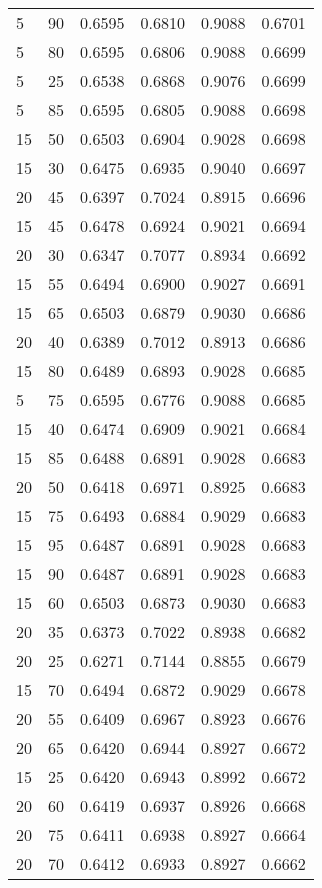 \begin{center}
\begin{longtable}{|l|l|l|l|l|l|}
5  & 90 & 0.6595 & 0.6810 & 0.9088 & 0.6701 \\
5  & 80 & 0.6595 & 0.6806 & 0.9088 & 0.6699 \\
5  & 25 & 0.6538 & 0.6868 & 0.9076 & 0.6699 \\
5  & 85 & 0.6595 & 0.6805 & 0.9088 & 0.6698 \\
15 & 50 & 0.6503 & 0.6904 & 0.9028 & 0.6698 \\
15 & 30 & 0.6475 & 0.6935 & 0.9040 & 0.6697 \\
20 & 45 & 0.6397 & 0.7024 & 0.8915 & 0.6696 \\
15 & 45 & 0.6478 & 0.6924 & 0.9021 & 0.6694 \\
20 & 30 & 0.6347 & 0.7077 & 0.8934 & 0.6692 \\
15 & 55 & 0.6494 & 0.6900 & 0.9027 & 0.6691 \\
15 & 65 & 0.6503 & 0.6879 & 0.9030 & 0.6686 \\
20 & 40 & 0.6389 & 0.7012 & 0.8913 & 0.6686 \\
15 & 80 & 0.6489 & 0.6893 & 0.9028 & 0.6685 \\
5  & 75 & 0.6595 & 0.6776 & 0.9088 & 0.6685 \\
15 & 40 & 0.6474 & 0.6909 & 0.9021 & 0.6684 \\
15 & 85 & 0.6488 & 0.6891 & 0.9028 & 0.6683 \\
20 & 50 & 0.6418 & 0.6971 & 0.8925 & 0.6683 \\
15 & 75 & 0.6493 & 0.6884 & 0.9029 & 0.6683 \\
15 & 95 & 0.6487 & 0.6891 & 0.9028 & 0.6683 \\
15 & 90 & 0.6487 & 0.6891 & 0.9028 & 0.6683 \\
15 & 60 & 0.6503 & 0.6873 & 0.9030 & 0.6683 \\
20 & 35 & 0.6373 & 0.7022 & 0.8938 & 0.6682 \\
20 & 25 & 0.6271 & 0.7144 & 0.8855 & 0.6679 \\
15 & 70 & 0.6494 & 0.6872 & 0.9029 & 0.6678 \\
20 & 55 & 0.6409 & 0.6967 & 0.8923 & 0.6676 \\
20 & 65 & 0.6420 & 0.6944 & 0.8927 & 0.6672 \\
15 & 25 & 0.6420 & 0.6943 & 0.8992 & 0.6672 \\
20 & 60 & 0.6419 & 0.6937 & 0.8926 & 0.6668 \\
20 & 75 & 0.6411 & 0.6938 & 0.8927 & 0.6664 \\
20 & 70 & 0.6412 & 0.6933 & 0.8927 & 0.6662 \\

\end{longtable}
\end{center}
